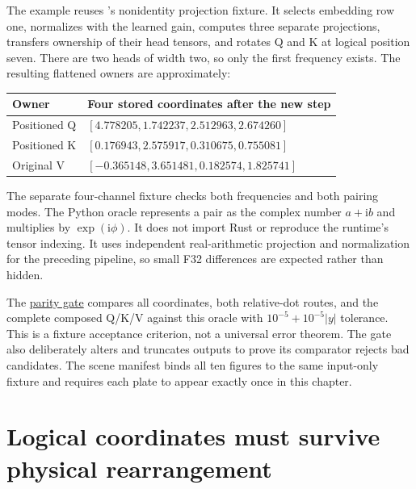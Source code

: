 The example reuses 's nonidentity projection fixture. It
selects embedding row one, normalizes with the learned gain, computes
three separate projections, transfers ownership of their head tensors,
and rotates Q and K at logical position seven. There are two heads of
width two, so only the first frequency exists. The resulting flattened
owners are approximately:

{\def\LTcaptype{none} %
\begin{longtable}[]{@{}ll@{}}
\toprule\noalign{}
Owner & Four stored coordinates after the new step \\
\midrule\noalign{}
\endhead
\bottomrule\noalign{}
\endlastfoot
Positioned Q & \([4.778205,1.742237,2.512963,2.674260]\) \\
Positioned K & \([0.176943,2.575917,0.310675,0.755081]\) \\
Original V & \([-0.365148,3.651481,0.182574,1.825741]\) \\
\end{longtable}
}

The separate four-channel fixture checks both frequencies and both
pairing modes. The Python oracle represents a pair as the complex number
\(a+\mathrm{i}b\) and multiplies by \(\exp(\mathrm{i}\phi)\). It does
not import Rust or reproduce the runtime's tensor indexing. It uses
independent real-arithmetic projection and normalization for the
preceding pipeline, so small F32 differences are expected rather than
hidden.

The
\href{https://github.com/hermonai/inside-the-llm-engine/blob/astra-visual-rewrite/scripts/check-rope-visual-parity.py}{parity
gate} compares all coordinates, both relative-dot routes, and the
complete composed Q/K/V against this oracle with \(10^{-5}+10^{-5}|y|\)
tolerance. This is a fixture acceptance criterion, not a universal error
theorem. The gate also deliberately alters and truncates outputs to
prove its comparator rejects bad candidates. The scene manifest binds
all ten figures to the same input-only fixture and requires each plate
to appear exactly once in this chapter.

\section{Logical coordinates must survive physical
rearrangement}\label{logical-coordinates-must-survive-physical-rearrangement}


